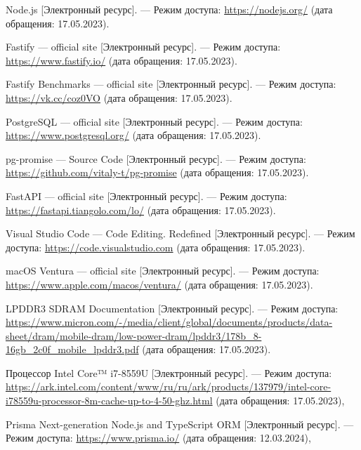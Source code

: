 \begin{thebibliography}{}
	 Node.js [Электронный ресурс]. --- Режим доступа: \url{https://nodejs.org/} (дата обращения: 17.05.2023).
	
	Fastify --- official site [Электронный ресурс]. --- Режим доступа: \url{https://www.fastify.io/} (дата обращения: 17.05.2023).
	
	Fastify Benchmarks --- official site [Электронный ресурс]. --- Режим доступа: \url{https://vk.cc/coz0VO} (дата обращения: 17.05.2023).

	PostgreSQL --- official site [Электронный ресурс]. --- Режим доступа: \url{https://www.postgresql.org/} (дата обращения: 17.05.2023).
	
	pg-promise --- Source Code [Электронный ресурс]. --- Режим доступа: \url{https://github.com/vitaly-t/pg-promise} (дата обращения: 17.05.2023).

	FastAPI --- official site [Электронный ресурс]. --- Режим доступа: \url{https://fastapi.tiangolo.com/lo/} (дата обращения: 17.05.2023).

	Visual Studio Code --- Code Editing. Redefined [Электронный ресурс]. --- Режим доступа: \url{https://code.visualstudio.com} (дата обращения: 17.05.2023).
	
	macOS Ventura --- official site [Электронный
	ресурс]. --- Режим доступа: \url{https://www.apple.com/macos/ventura/} (дата обращения: 17.05.2023).

	LPDDR3 SDRAM Documentation [Электронный
	ресурс]. --- Режим доступа: \url{https://www.micron.com/-/media/client/global/documents/products/data-sheet/dram/mobile-dram/low-power-dram/lpddr3/178b_8-16gb_2c0f_mobile_lpddr3.pdf} (дата обращения: 17.05.2023).

	Процессор Intel Core™ i7-8559U [Электронный ресурс]. --- Режим доступа: \url{https://ark.intel.com/content/www/ru/ru/ark/products/137979/intel-core-i78559u-processor-8m-cache-up-to-4-50-ghz.html} (дата обращения: 17.05.2023),
	
	Prisma Next-generation Node.js and TypeScript ORM [Электронный ресурс]. --- Режим доступа: \url{https://www.prisma.io/} (дата обращения: 12.03.2024),

\end{thebibliography}
\endgroup

\pagebreak